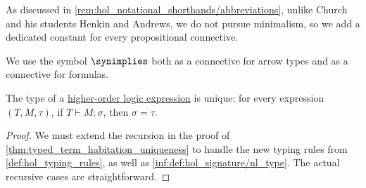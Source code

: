 \begin{comments}
  \item As discussed in \cref{rem:hol_notational_shorthands/abbreviations}, unlike Church and his students Henkin and Andrews, we do not pursue minimalism, so we add a dedicated constant for every propositional connective.

  \item We use the symbol \( \synimplies \) both as a connective for arrow types and as a connective for formulas.
\end{comments}

\begin{proposition}\label{thm:hol_expression_type_uniqueness}
  The type of a \hyperref[def:hol_expression]{higher-order logic expression} is unique: for every expression \( (T, M, \tau) \), if \( T \vdash M: \sigma \), then \( \sigma = \tau \).
\end{proposition}
\begin{proof}
  We must extend the recursion in the proof of \cref{thm:typed_term_habitation_uniqueness} to handle the new typing rules from \cref{def:hol_typing_rules}, as well as \ref{inf:def:hol_signature/nl_type}. The actual recursive cases are straightforward.
\end{proof}

